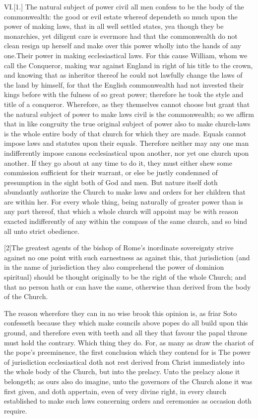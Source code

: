 VI.[1.] The natural subject of power civil all men confess to be the body of the commonwealth: the good or evil estate whereof dependeth so much upon the power of making laws, that in all well settled states, yea though they be monarchies, yet diligent care is evermore had that the commonwealth do not clean resign up herself and make over this power wholly into the hands of any one.Their power in making ecclesiastical laws. For this cause William, whom we call the Conqueror, making war against England in right of his title to the crown, and knowing that as inheritor thereof he could not lawfully change the laws of the land by himself, for that the English commonwealth had not invested their kings before with the fulness of so great power; therefore he took the style and title of a conqueror. Wherefore, as they themselves cannot choose but grant that the natural subject of power to make laws civil is the commonwealth; so we affirm that in like congruity the true original subject of power also to make church-laws is the whole entire body of that church for which they are made. Equals cannot impose laws and statutes upon their equals. Therefore neither may any one man indifferently impose canons ecclesiastical upon another, nor yet one church upon another. If they go about at any time to do it, they must either shew some commission sufficient for their warrant, or else be justly condemned of presumption in the sight both of God and men. But nature itself doth abundantly authorize the Church to make laws and orders for her children that are within her. For every whole thing, being naturally of greater power than is any part thereof, that which a whole church will appoint may be with reason exacted indifferently of any within the compass of the same church, and so bind all unto strict obedience.

[2]The greatest agents of the bishop of Rome’s inordinate sovereignty strive against no one point with such earnestness as against this, that jurisdiction (and in the name of jurisdiction they also comprehend the power of dominion spiritual)  should be thought originally to be the right of the whole Church; and that no person hath or can have the same, otherwise than derived from the body of the Church.

The reason wherefore they can in no wise brook this opinion is, as friar Soto confesseth because they which make councils above popes do all build upon this ground, and therefore even with teeth and all they that favour the papal throne must hold the contrary. Which thing they do. For, as many as draw the chariot of the pope’s preeminence, the first conclusion which they contend for is The power of jurisdiction ecclesiastical doth not rest derived from Christ immediately into the whole body of the Church, but into the prelacy. Unto the prelacy alone it belongeth; as ours also do imagine, unto the governors of the Church alone it was first given, and doth appertain, even of very divine right, in every church established to make such laws concerning orders and ceremonies as occasion doth require.

